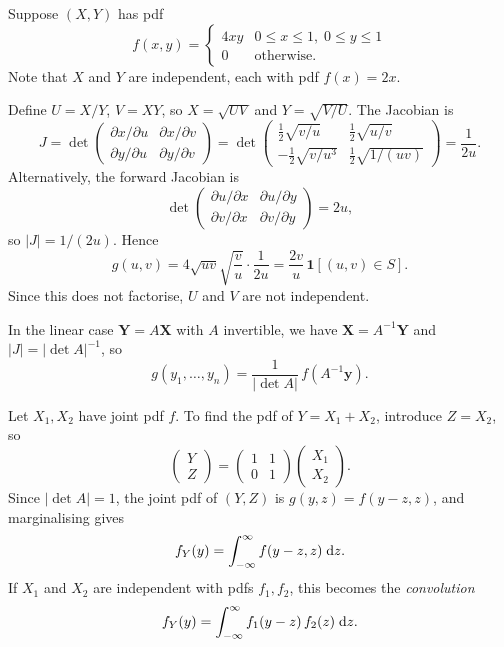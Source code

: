 \documentclass[a4paper]{article}
\begin{document}
\begin{eg}
  Suppose $(X, Y)$ has pdf
  \[
    f(x, y) =
    \begin{cases}
      4xy & 0 \leq x \leq 1,\; 0 \leq y \leq 1\\
      0 & \text{otherwise.}
    \end{cases}
  \]
  Note that $X$ and $Y$ are independent, each with pdf $f(x) = 2x$.

  Define $U = X/Y$, $V = XY$, so $X = \sqrt{UV}$ and $Y = \sqrt{V/U}$.
  The Jacobian is
  \[
    J = \det
    \begin{pmatrix}
      \partial x/\partial u & \partial x/\partial v\\
      \partial y/\partial u & \partial y/\partial v
    \end{pmatrix}
    =
    \det
    \begin{pmatrix}
      \frac{1}{2}\sqrt{v/u} & \frac{1}{2}\sqrt{u/v}\\
      -\frac{1}{2}\sqrt{v/u^3} & \frac{1}{2}\sqrt{1/(uv)}
    \end{pmatrix}
    = \frac{1}{2u}.
  \]
  Alternatively, the forward Jacobian is
  \[
    \det
    \begin{pmatrix}
      \partial u/\partial x & \partial u/\partial y\\
      \partial v/\partial x & \partial v/\partial y
    \end{pmatrix} = 2u,
  \]
  so $|J| = 1/(2u)$.
  Hence
  \[
    g(u, v) = 4\sqrt{uv}\sqrt{\frac{v}{u}} \cdot \frac{1}{2u} = \frac{2v}{u}\,\mathbf{1}[(u, v) \in S].
  \]
  Since this does not factorise, $U$ and $V$ are not independent.
\end{eg}

\begin{remark}
  In the linear case $\mathbf{Y} = A\mathbf{X}$ with $A$ invertible, we have $\mathbf{X} = A^{-1}\mathbf{Y}$ and $|J| = |\det A|^{-1}$, so
  \[
    g(y_1, \dotsc, y_n) = \frac{1}{|\det A|}\,f(A^{-1}\mathbf{y}).
  \]
\end{remark}

\begin{eg}
  Let $X_1, X_2$ have joint pdf $f$.
  To find the pdf of $Y = X_1 + X_2$, introduce $Z = X_2$, so
  \[
    \begin{pmatrix}
      Y\\
      Z
    \end{pmatrix} =
    \begin{pmatrix}
      1 & 1 \\
      0 & 1
    \end{pmatrix}
    \begin{pmatrix}
      X_1\\
      X_2
    \end{pmatrix}.
  \]
  Since $|\det A| = 1$, the joint pdf of $(Y, Z)$ is $g(y, z) = f(y - z, z)$, and marginalising gives
  \[
    f_Y(y) = \int_{-\infty}^\infty f(y - z, z)\;\mathrm{d} z.
  \]
  If $X_1$ and $X_2$ are independent with pdfs $f_1, f_2$, this becomes the \emph{convolution}
  \[
    f_Y(y) = \int_{-\infty}^\infty f_1(y - z)\, f_2(z)\;\mathrm{d} z.
  \]
\end{eg}
\end{document}
